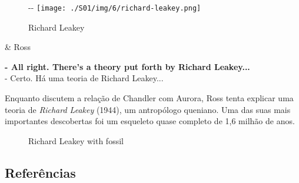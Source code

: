 \begin{figure}[!ht]
  \begin{adjustwidth}{-\oddsidemargin-1in}{-\rightmargin}
    \centering
    \texttt{[image: ./S01/img/6/richard-leakey.png]}
    \caption{Richard Leakey\label{fig:richard-leakey}}
  \end{adjustwidth}
\end{figure}

\begin{tcolorbox}[enhanced,center upper,
    drop fuzzy shadow southeast, boxrule=0.3pt,
    lower separated=false,
    colframe=black!30!dialogoBorder,colback=white]
\begin{minipage}[c]{0.14\linewidth}
   & \centering \scriptsize{Ross}
\end{minipage}
\hspace{.1mm}
\begin{minipage}[c]{0.8\linewidth}
  \textbf{- All right. There's a theory put forth by Richard Leakey...}\\
  - Certo. Há uma teoria de Richard Leakey...
\end{minipage}
\end{tcolorbox}

Enquanto discutem a relação de Chandler com Aurora, Ross tenta explicar
uma teoria de \emph{Richard Leakey} (1944), um antropólogo queniano. Uma
das suas mais importantes descobertas foi um esqueleto quase completo de
1,6 milhão de anos.

\begin{figure}
  \centering
    \caption{Richard Leakey with fossil\label{fig:richard-leakey-with-fossil}}
\end{figure}

\hypertarget{referuxeancias-1}{%
\subsection{Referências}\label{referuxeancias-1}}

